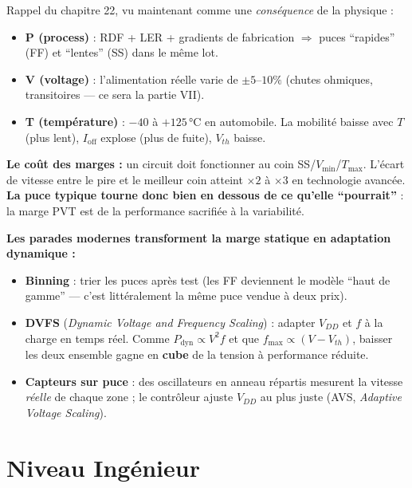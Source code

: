 \documentclass[12pt,a4paper,twoside]{book}
\begin{document}
\begin{formule}
Rappel du chapitre 22, vu maintenant comme une \textit{conséquence} de la physique :
\begin{itemize}[nosep]
\item \textbf{P (process)} : RDF + LER + gradients de fabrication $\Rightarrow$ puces ``rapides'' (FF) et ``lentes'' (SS) dans le même lot.
\item \textbf{V (voltage)} : l'alimentation réelle varie de $\pm 5$--$10\%$ (chutes ohmiques, transitoires --- ce sera la partie VII).
\item \textbf{T (température)} : $-40$ à $+125\,$°C en automobile. La mobilité baisse avec $T$ (plus lent), $I_{\text{off}}$ explose (plus de fuite), $V_{th}$ baisse.
\end{itemize}

\textbf{Le coût des marges :} un circuit doit fonctionner au coin SS/$V_{\min}$/$T_{\max}$. L'écart de vitesse entre le pire et le meilleur coin atteint $\times 2$ à $\times 3$ en technologie avancée. \textbf{La puce typique tourne donc bien en dessous de ce qu'elle ``pourrait''} : la marge PVT est de la performance sacrifiée à la variabilité.
\end{formule}

\begin{intuition}
\textbf{Les parades modernes transforment la marge statique en adaptation dynamique :}
\begin{itemize}[nosep]
\item \textbf{Binning} : trier les puces après test (les FF deviennent le modèle ``haut de gamme'' --- c'est littéralement la même puce vendue à deux prix).
\item \textbf{DVFS} (\textit{Dynamic Voltage and Frequency Scaling}) : adapter $V_{DD}$ et $f$ à la charge en temps réel. Comme $P_{\text{dyn}} \propto V^2 f$ et que $f_{\max} \propto (V-V_{th})$, baisser les deux ensemble gagne en \textbf{cube} de la tension à performance réduite.
\item \textbf{Capteurs sur puce} : des oscillateurs en anneau répartis mesurent la vitesse \textit{réelle} de chaque zone ; le contrôleur ajuste $V_{DD}$ au plus juste (AVS, \textit{Adaptive Voltage Scaling}).
\end{itemize}
\end{intuition}

\section{Niveau Ingénieur}
\end{document}
